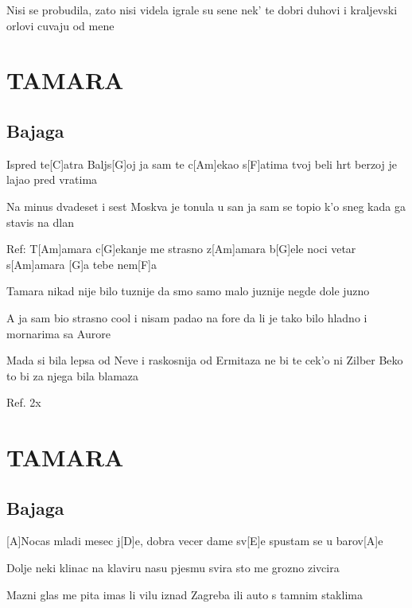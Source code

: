 \documentclass{article}
\begin{document}
\begin{multicols}{2}
\begin{guitar}
	Nisi se probudila, zato nisi videla
	igrale su sene
	nek' te dobri duhovi
	i kraljevski orlovi
	cuvaju od mene
	
\end{guitar}

\section*{TAMARA}
%
\subsection*{Bajaga}
\begin{guitar}
	
	Ispred te[C]atra Baljs[G]oj
	ja sam te c[Am]ekao s[F]atima
	tvoj beli hrt berzoj
	je lajao pred vratima
	
	Na minus dvadeset i sest
	Moskva je tonula u san
	ja sam se topio k'o sneg
	kada ga stavis na dlan
	
	Ref:
	T[Am]amara
	c[G]ekanje me strasno z[Am]amara
	b[G]ele noci vetar s[Am]amara
	[G]a tebe nem[F]a
	
	Tamara
	nikad nije bilo tuznije
	da smo samo malo juznije
	negde dole juzno
	
	A ja sam bio strasno cool
	i nisam padao na fore
	da li je tako bilo hladno
	i mornarima sa Aurore
	
	Mada si bila lepsa od Neve
	i raskosnija od Ermitaza
	ne bi te cek'o ni Zilber Beko
	to bi za njega bila blamaza
	
	Ref. 2x
	
\end{guitar}

\section*{TAMARA}
%
\subsection*{Bajaga}
\begin{guitar}
	
	[A]Nocas mladi mesec j[D]e, dobra vecer dame sv[E]e
	spustam se u barov[A]e
	
	Dolje neki klinac na klaviru nasu pjesmu svira
	sto me grozno zivcira
	
	Mazni glas me pita imas li vilu iznad Zagreba
	ili auto s tamnim staklima
	

\end{guitar}
\end{multicols}
\end{document}
